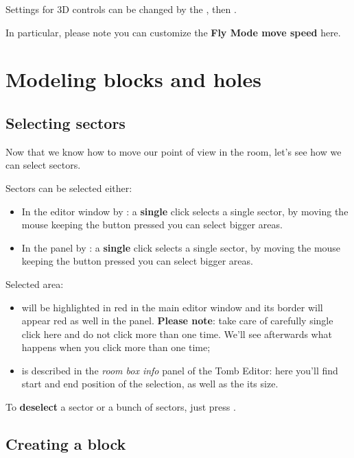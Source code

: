 Settings for 3D controls can be changed by the , then .
\par In particular, please note you can customize the \textbf{Fly Mode move speed} here.

\chapter{Modeling blocks and holes}

\section{Selecting sectors}

Now that we know how to move our point of view in the room, let's see how we can select sectors.
\par Sectors can be selected either:
\begin{itemize}
\item In the editor window by : a \textbf{single} click selects a single sector, by moving the mouse keeping the button pressed you can select bigger areas.
\item In the  panel by : a \textbf{single} click selects a single sector, by moving the mouse keeping the button pressed you can select bigger areas.
\end{itemize}

Selected area:
\begin{itemize}
    \item will be highlighted in red in the main editor window and its border will appear red as well in the  panel. \textbf{Please note}: take care of carefully single click here and do not click more than one time. We'll see afterwards what happens when you click more than one time;
    \item is described in the \emph{room box info} panel of the Tomb Editor: here you'll find start and end position of the selection, as well as the its size.
\end{itemize}

\par To \textbf{deselect} a sector or a bunch of sectors, just press .

\section{Creating a block}

